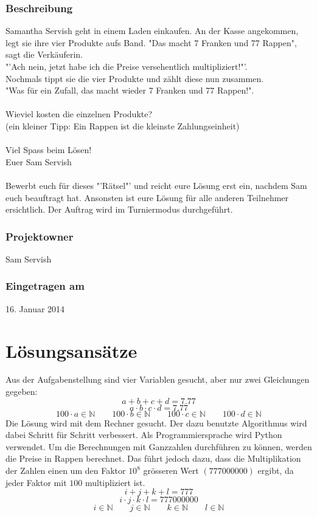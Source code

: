 \documentclass[a4paper, 10pt, fleqn]{article}
\begin{document}
\subsubsection*{Beschreibung}
Samantha Servish geht in einem Laden einkaufen. An der Kasse angekommen, legt 
sie ihre vier Produkte aufs Band. "Das macht 7 Franken und 77 Rappen", sagt 
die Verkäuferin. \\
"'Ach nein, jetzt habe ich die Preise versehentlich multipliziert!"'. \\
Nochmals tippt sie die vier Produkte und zählt diese nun zusammen. \\
"Was für ein Zufall, das macht wieder 7 Franken und 77 Rappen!". \\\\
%
Wieviel kosten die einzelnen Produkte? \\
(ein kleiner Tipp: Ein Rappen ist die kleinste Zahlungseinheit) \\\\
%
Viel Spass beim Lösen! \\
Euer Sam Servish \\\\
%
Bewerbt euch für dieses "'Rätsel"' und reicht eure Lösung erst ein, nachdem Sam 
euch beauftragt hat. Ansonsten ist eure Lösung für alle anderen Teilnehmer 
ersichtlich. Der Auftrag wird im Turniermodus durchgeführt. 

\subsubsection*{Projektowner}
Sam Servish 

\subsubsection*{Eingetragen am}
16. Januar 2014 \\

\newpage

\section{Lösungsansätze}
Aus der Aufgabenstellung sind vier Variablen gesucht, aber nur zwei Gleichungen 
gegeben: 
\[ a + b + c + d = 7.77 \]
\[ a \cdot b \cdot c \cdot d = 7.77 \]
\[ 100 \cdot a \in \mathbb{N} \qquad 100 \cdot b \in \mathbb{N} \qquad 
100 \cdot c \in \mathbb{N} \qquad 100 \cdot d \in \mathbb{N} \]
Die Lösung wird mit dem Rechner gesucht. Der dazu benutzte Algorithmus wird 
dabei Schritt für Schritt verbessert. Als Programmiersprache wird Python 
verwendet. Um die Berechnungen mit Ganzzahlen durchführen zu können, werden 
die Preise in Rappen berechnet. Das führt jedoch dazu, dass die Multiplikation 
der Zahlen einen um den Faktor $10^8$ grösseren Wert $(777000000)$ ergibt, da 
jeder Faktor mit $100$ multipliziert ist. 
\[ i + j + k + l = 777 \]
\[ i \cdot j \cdot k \cdot l = 777000000 \]
\[ i \in \mathbb{N} \qquad j \in \mathbb{N} \qquad 
k \in \mathbb{N} \qquad l \in \mathbb{N} \]
\end{document}
